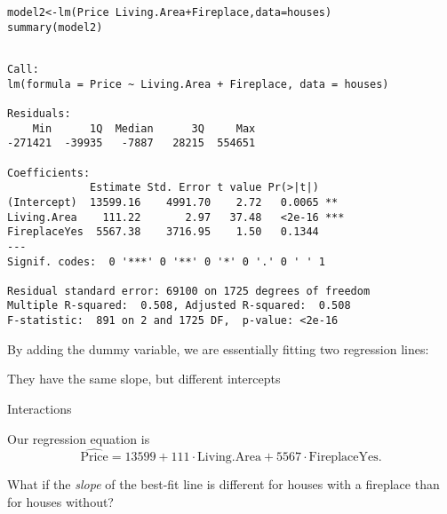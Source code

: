 \documentclass{beamer}\usepackage[]{graphicx}\usepackage[]{color}
\makeatletter
\newcommand{\hlopt}[1]{\textcolor[rgb]{1,0.894,0.769}{#1}}%
\newcommand{\hlstd}[1]{\textcolor[rgb]{1,0.894,0.769}{#1}}%
\newcommand{\hlkwb}[1]{\textcolor[rgb]{0.804,0.776,0.451}{#1}}%
\newcommand{\hlkwc}[1]{\textcolor[rgb]{0.78,0.941,0.545}{#1}}%
\newcommand{\hlkwd}[1]{\textcolor[rgb]{1,0.78,0.769}{#1}}%
\newenvironment{kframe}{%
 \def\at@end@of@kframe{}%
 \ifinner\ifhmode%
  \def\at@end@of@kframe{\end{minipage}}%
  \begin{minipage}{\columnwidth}%
 \fi\fi%
 \def\FrameCommand##1{\hskip\@totalleftmargin \hskip-\fboxsep
 \colorbox{shadecolor}{##1}\hskip-\fboxsep
     \hskip-\linewidth \hskip-\@totalleftmargin \hskip\columnwidth}%
 \MakeFramed {\advance\hsize-\width
   \@totalleftmargin\z@ \linewidth\hsize
   \@setminipage}}%
 {\par\unskip\endMakeFramed%
 \at@end@of@kframe}
\newenvironment{knitrout}{}{} %
\makeatother
\begin{document}
\begin{darkframes}
    \begin{frame}[fragile]
      \fontsize{8}{8}\selectfont
\begin{knitrout}
\begin{kframe}
\begin{alltt}
\hlstd{model2} \hlkwb{<-} \hlkwd{lm}\hlstd{(Price} \hlopt{~} \hlstd{Living.Area} \hlopt{+} \hlstd{Fireplace,} \hlkwc{data}\hlstd{=houses)}
\hlkwd{summary}\hlstd{(model2)}
\end{alltt}
\begin{verbatim}

Call:
lm(formula = Price ~ Living.Area + Fireplace, data = houses)

Residuals:
    Min      1Q  Median      3Q     Max 
-271421  -39935   -7887   28215  554651 

Coefficients:
             Estimate Std. Error t value Pr(>|t|)    
(Intercept)  13599.16    4991.70    2.72   0.0065 ** 
Living.Area    111.22       2.97   37.48   <2e-16 ***
FireplaceYes  5567.38    3716.95    1.50   0.1344    
---
Signif. codes:  0 '***' 0 '**' 0 '*' 0 '.' 0 ' ' 1

Residual standard error: 69100 on 1725 degrees of freedom
Multiple R-squared:  0.508,	Adjusted R-squared:  0.508 
F-statistic:  891 on 2 and 1725 DF,  p-value: <2e-16
\end{verbatim}
\end{kframe}
\end{knitrout}
    \end{frame}

    \begin{frame}
      By adding the dummy variable, we are essentially fitting two regression lines:
\begin{knitrout}


\end{knitrout}
    They have the same slope, but different intercepts
    \end{frame}

    \begin{frame}{Interactions}
      \begin{center}
        Our regression equation is
        \[
          \widehat{\text{Price}} = 13599
            + 111 \cdot\text{Living.Area}
            + 5567 \cdot\text{FireplaceYes}.
        \]

        \bigskip\pause

        What if the \emph{slope} of the best-fit line is different for houses with a fireplace than for houses without?


\end{center}
\end{frame}
\end{darkframes}
\end{document}
